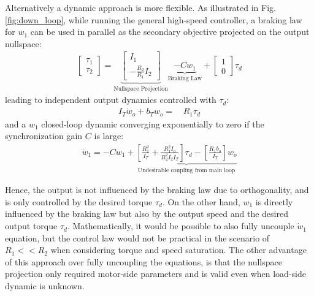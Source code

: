 Alternatively a dynamic approach is more flexible. As illustrated in Fig. \ref{fig:down_loop}, while running the general high-speed controller, a braking law for $w_1$ can be used in parallel as the secondary objective projected on the output nullspace:
\begin{align}
\left[ \begin{array}{c}
\tau_1 \\
\tau_2
\end{array} \right]
 = 
\underbrace{\left[ \begin{array}{c}
I_1 \\
-\frac{R_2 }{R_1 }  I_2
\end{array} \right]}_{\text{Nullspace Projection}} \underbrace{-C w_1}_{\text{Braking Law}} + 
\left[ \begin{array}{c}
1 \\
0 
\end{array} \right]  \tau_d
\label{eq:syncrhonization_ctl}
\end{align}
leading to independent output dynamics controlled with $\tau_d$:
\begin{align}
I_T \dot{w}_o +
b_T  w_o
=& \, R_1 \tau_d  
\end{align}
and a $w_1$ closed-loop dynamic converging exponentially to zero if the synchronization gain $C$ is large:
\begin{align}
 \dot{w}_1 = -C w_1 + \underbrace{\left[\frac{R_1^2}{I_T} + \frac{R_1^2 I_o}{R_2^2 I_2 I_T} \right] \tau_d - \left[\frac{R_1 b_o}{I_T}\right] w_o }_{\text{Undesirable coupling from main loop}}
\end{align}

Hence, the output is not influenced by the braking law due to orthogonality, and is only controlled by the desired torque $\tau_d$. On the other hand, $w_1$ is directly influenced by the braking law but also by the output speed and the desired output torque $\tau_d$. Mathematically, it would be possible to also fully uncouple $\dot{w}_1$ equation, but the control law would not be practical in the scenario of $R_1<<R_2$ when considering torque and speed saturation. The other advantage of this approach over fully uncoupling the equations, is that the nullspace projection only required motor-side parameters and is valid even when load-side dynamic is unknown. 

